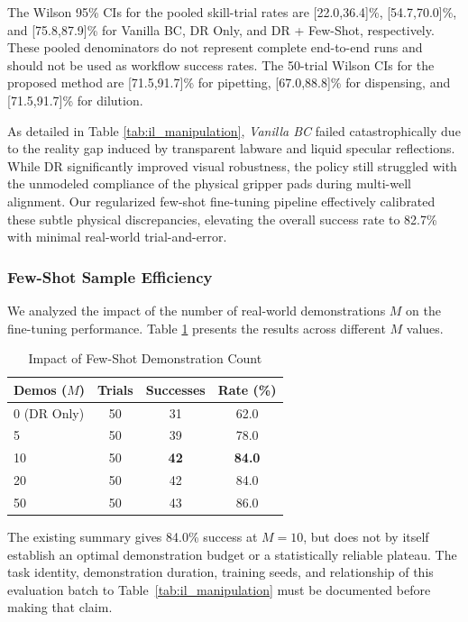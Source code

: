 The Wilson 95\% CIs for the pooled skill-trial rates are [22.0,36.4]\%, [54.7,70.0]\%, and [75.8,87.9]\% for Vanilla BC, DR Only, and DR + Few-Shot, respectively. These pooled denominators do not represent complete end-to-end runs and should not be used as workflow success rates. The 50-trial Wilson CIs for the proposed method are [71.5,91.7]\% for pipetting, [67.0,88.8]\% for dispensing, and [71.5,91.7]\% for dilution.

As detailed in Table \ref{tab:il_manipulation}, \textit{Vanilla BC} failed catastrophically due to the reality gap induced by transparent labware and liquid specular reflections. While DR significantly improved visual robustness, the policy still struggled with the unmodeled compliance of the physical gripper pads during multi-well alignment. Our regularized few-shot fine-tuning pipeline effectively calibrated these subtle physical discrepancies, elevating the overall success rate to 82.7\% with minimal real-world trial-and-error.

\subsubsection{Few-Shot Sample Efficiency}
\label{subsec:few_shot}

We analyzed the impact of the number of real-world demonstrations $M$ on the fine-tuning performance. Table \ref{tab:few_shot} presents the results across different $M$ values.

\begin{table}[!t]
\renewcommand{\arraystretch}{1.3}
\caption{Impact of Few-Shot Demonstration Count}
\label{tab:few_shot}
\centering
\begin{tabular}{lccc}
\hline\hline
\textbf{Demos ($M$)} & \textbf{Trials} & \textbf{Successes} & \textbf{Rate (\%)} \\ \hline
0 (DR Only) & 50 & 31 & 62.0 \\
5 & 50 & 39 & 78.0 \\
10 & 50 & \textbf{42} & \textbf{84.0} \\
20 & 50 & 42 & 84.0 \\
50 & 50 & 43 & 86.0 \\ \hline\hline
\end{tabular}
\end{table}

The existing summary gives 84.0\% success at $M=10$, but does not by itself establish an optimal demonstration budget or a statistically reliable plateau. The task identity, demonstration duration, training seeds, and relationship of this evaluation batch to Table~\ref{tab:il_manipulation} must be documented before making that claim.

